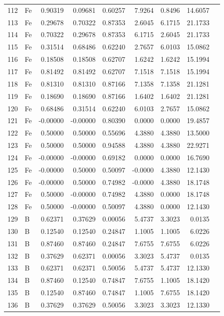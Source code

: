 \begin{longtable}{rlrrrrrrl}
112 & Fe & 0.90319 & 0.09681 & 0.60257 & 7.9264 & 0.8496 & 14.6057 &  \\
113 & Fe & 0.29678 & 0.70322 & 0.87353 & 2.6045 & 6.1715 & 21.1733 &  \\
114 & Fe & 0.70322 & 0.29678 & 0.87353 & 6.1715 & 2.6045 & 21.1733 &  \\
115 & Fe & 0.31514 & 0.68486 & 0.62240 & 2.7657 & 6.0103 & 15.0862 &  \\
116 & Fe & 0.18508 & 0.18508 & 0.62707 & 1.6242 & 1.6242 & 15.1994 &  \\
117 & Fe & 0.81492 & 0.81492 & 0.62707 & 7.1518 & 7.1518 & 15.1994 &  \\
118 & Fe & 0.81310 & 0.81310 & 0.87166 & 7.1358 & 7.1358 & 21.1281 &  \\
119 & Fe & 0.18690 & 0.18690 & 0.87166 & 1.6402 & 1.6402 & 21.1281 &  \\
120 & Fe & 0.68486 & 0.31514 & 0.62240 & 6.0103 & 2.7657 & 15.0862 &  \\
121 & Fe & -0.00000 & -0.00000 & 0.80390 & 0.0000 & 0.0000 & 19.4857 &  \\
122 & Fe & 0.50000 & 0.50000 & 0.55696 & 4.3880 & 4.3880 & 13.5000 &  \\
123 & Fe & 0.50000 & 0.50000 & 0.94588 & 4.3880 & 4.3880 & 22.9271 &  \\
124 & Fe & -0.00000 & -0.00000 & 0.69182 & 0.0000 & 0.0000 & 16.7690 &  \\
125 & Fe & -0.00000 & 0.50000 & 0.50097 & -0.0000 & 4.3880 & 12.1430 &  \\
126 & Fe & -0.00000 & 0.50000 & 0.74982 & -0.0000 & 4.3880 & 18.1748 &  \\
127 & Fe & 0.50000 & -0.00000 & 0.74982 & 4.3880 & 0.0000 & 18.1748 &  \\
128 & Fe & 0.50000 & -0.00000 & 0.50097 & 4.3880 & 0.0000 & 12.1430 &  \\
129 & B & 0.62371 & 0.37629 & 0.00056 & 5.4737 & 3.3023 & 0.0135 &  \\
130 & B & 0.12540 & 0.12540 & 0.24847 & 1.1005 & 1.1005 & 6.0226 &  \\
131 & B & 0.87460 & 0.87460 & 0.24847 & 7.6755 & 7.6755 & 6.0226 &  \\
132 & B & 0.37629 & 0.62371 & 0.00056 & 3.3023 & 5.4737 & 0.0135 &  \\
133 & B & 0.62371 & 0.62371 & 0.50056 & 5.4737 & 5.4737 & 12.1330 &  \\
134 & B & 0.87460 & 0.12540 & 0.74847 & 7.6755 & 1.1005 & 18.1420 &  \\
135 & B & 0.12540 & 0.87460 & 0.74847 & 1.1005 & 7.6755 & 18.1420 &  \\
136 & B & 0.37629 & 0.37629 & 0.50056 & 3.3023 & 3.3023 & 12.1330 &  \\
\bottomrule
\end{longtable}

